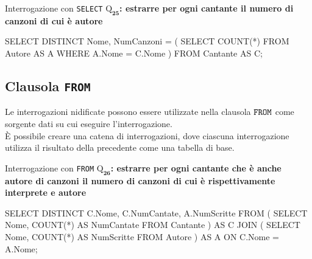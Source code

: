
\begin{esempiobox}{Interrogazione con \texttt{SELECT}}
$\boldsymbol{\mathrm{Q}_{25}}$\textbf{: estrarre per ogni cantante il numero di canzoni di cui è autore}
\begin{codiceSQL}
SELECT DISTINCT Nome, NumCanzoni = (
  SELECT COUNT(*)
  FROM Autore AS A
    WHERE A.Nome = C.Nome
)
FROM Cantante AS C;
\end{codiceSQL}
\end{esempiobox}


\subsection{Clausola \texttt{FROM}}
Le interrogazioni nidificate possono essere utilizzate nella clausola $\verb|FROM|$ come sorgente dati su cui eseguire l’interrogazione.\\[0.2ex]
È possibile creare una catena di interrogazioni, dove ciascuna interrogazione utilizza il risultato della precedente come una tabella di base.

\begin{esempiobox}{Interrogazione con \texttt{FROM}}
$\boldsymbol{\mathrm{Q}_{26}}$\textbf{: estrarre per ogni cantante che è anche autore di canzoni il numero di canzoni di cui è rispettivamente interprete e autore}
\begin{codiceSQL}
SELECT DISTINCT C.Nome, C.NumCantate, A.NumScritte
FROM (
  SELECT Nome, COUNT(*) AS NumCantate
  FROM Cantante
) AS C
JOIN (
  SELECT Nome, COUNT(*) AS NumScritte
  FROM Autore
) AS A ON C.Nome = A.Nome;
\end{codiceSQL}
\end{esempiobox}